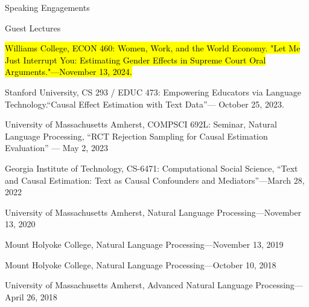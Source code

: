 \documentclass{resume} %
\begin{document}
\begin{rSection}{Speaking Engagements}
\begin{rSubsection}{Guest Lectures}{}{}{}
\item \hl{Williams College, ECON 460: Women, Work, and the World Economy. "Let Me Just Interrupt You: Estimating Gender Effects in Supreme Court Oral Arguments."---November 13, 2024.}
\item Stanford University, CS 293 / EDUC 473: Empowering Educators via Language Technology.``Causal Effect Estimation with Text Data''--- October 25, 2023. 
\item University of Massachusetts Amherst, COMPSCI 692L: Seminar, Natural Language Processing, ``RCT Rejection Sampling for Causal Estimation Evaluation'' --- May 2, 2023
\item Georgia Institute of Technology, CS-6471: Computational Social Science, ``Text and Causal Estimation: Text as Causal Confounders and Mediators''---March 28, 2022
\item University of Massachusetts Amherst, Natural Language Processing---November 13, 2020 
\item Mount Holyoke College, Natural Language Processing---November 13, 2019
\item Mount Holyoke College, Natural Language Processing---October 10, 2018
\item University of Massachusetts Amherst, Advanced Natural Language Processing---April 26, 2018
\end{rSubsection}

\end{rSection}


\end{document}
